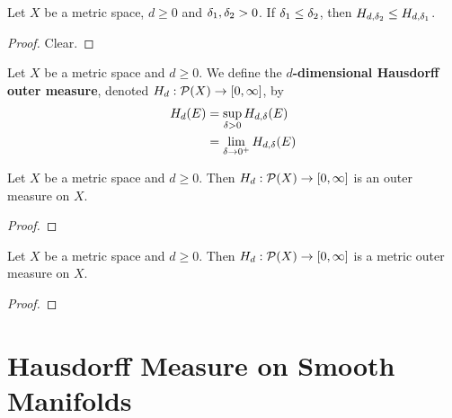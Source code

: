 \documentclass{book}
\begin{document}
	\begin{ex}
	Let $X$ be a metric space, $d \geq 0$ and $\delta_1, \delta_2 >0$. If $\delta_1 \leq \delta_2$, then $H_{d, \delta_2} \leq H_{d, \delta_1}$.
	\end{ex}
	
	\begin{proof}
	Clear.
	\end{proof}
	
	\begin{defn}
	Let $X$ be a metric space and $d \geq 0$. We define the \textbf{$d$-dimensional Hausdorff outer measure}, denoted $H_{d}: \mathcal{P}(X) \rightarrow [0, \infty]$, by 
	\begin{align*}
	H_{d}(E) 
	&= \sup_{\delta > 0} H_{d, \delta}(E) \\
	&= \lim_{\delta \rightarrow 0^+} H_{d, \delta}(E)
	\end{align*}
	\end{defn}
	
	\begin{ex}
	Let $X$ be a metric space and $d \geq 0$. Then $H_d: \mathcal{P}(X) \rightarrow [0, \infty]$ is an outer measure on $X$.
	\end{ex}
	
	\begin{proof}
	
	\end{proof}
	
	\begin{ex}
	Let $X$ be a metric space and $d \geq 0$. Then $H_d: \mathcal{P}(X) \rightarrow [0, \infty]$ is a metric outer measure on $X$.
	\end{ex}
	
	\begin{proof}
	
	\end{proof}
	
	
	
	
	
	
	
	
	
	
	
	
	
	
	
	
	
	
	\newpage
	\section{Hausdorff Measure on Smooth Manifolds}
	
	
	
	
	
	
	
\end{document}

